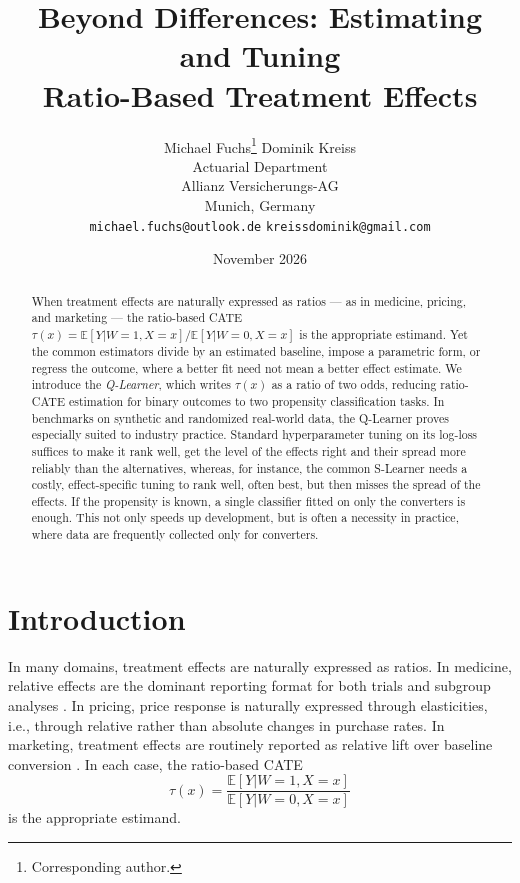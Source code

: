 \documentclass{article}
\title{Beyond Differences: Estimating and Tuning\\Ratio-Based Treatment Effects}
\date{November 2026}
\author{
  Michael Fuchs\thanks{Corresponding author.} \qquad Dominik Kreiss \\
  Actuarial Department \\
  Allianz Versicherungs-AG \\
  Munich, Germany \\
  \texttt{michael.fuchs@outlook.de} \quad \texttt{kreissdominik@gmail.com}
}
\begin{document}
\maketitle

\begin{abstract}
When treatment effects are naturally expressed as ratios --- as in
medicine, pricing, and marketing --- the ratio-based CATE
$\tau(x) = \mathbb{E}[Y|W{=}1,X{=}x] / \mathbb{E}[Y|W{=}0,X{=}x]$ is
the appropriate estimand. Yet the common estimators divide by an estimated
baseline, impose a parametric form, or regress the outcome, where a better
fit need not mean a better effect estimate. We introduce the
\emph{Q-Learner}, which writes $\tau(x)$ as a ratio of two odds, reducing
ratio-CATE estimation for binary outcomes to two propensity classification
tasks. In benchmarks on synthetic and randomized real-world data, the
Q-Learner proves especially suited to industry practice. Standard
hyperparameter tuning on its log-loss suffices to make it rank well, get the
level of the effects right and their spread more reliably than the
alternatives, whereas, for instance,
the common S-Learner needs a costly, effect-specific tuning to rank well,
often best, but then misses the spread of the effects. If the propensity is known, a single classifier fitted on only
the converters is enough. This not only speeds up development, but is often
a necessity in practice, where data are frequently collected only for
converters.
\end{abstract}


\section{Introduction}
\label{sec:introduction}

In many domains, treatment effects are naturally expressed as ratios.
In medicine, relative effects are the dominant reporting format for
both trials and subgroup analyses \citep{andersen2021}. In pricing,
price response is naturally expressed through elasticities, i.e.,
through relative rather than absolute changes in purchase rates. In
marketing, treatment effects are routinely reported as relative lift
over baseline conversion \citep{kohavi2020}. In each
case, the ratio-based CATE
\begin{equation}
\label{eq:ratio-cate}
\tau(x) = \frac{\mathbb{E}[Y|W{=}1,X{=}x]}{\mathbb{E}[Y|W{=}0,X{=}x]}
\end{equation}
is the appropriate estimand.
\end{document}
